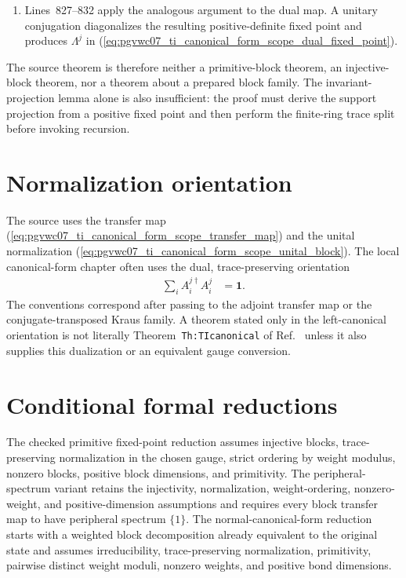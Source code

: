 \documentclass{article}
\begin{document}
\begin{enumerate}
    \item Lines~827--832 apply the analogous argument to the dual map. A
          unitary conjugation diagonalizes the resulting positive-definite
          fixed point and produces $\Lambda^j$ in
          (\ref{eq:pgvwc07_ti_canonical_form_scope_dual_fixed_point}).
\end{enumerate}

The source theorem is therefore neither a primitive-block theorem, an
injective-block theorem, nor a theorem about a prepared block family. The
invariant-projection lemma alone is also insufficient: the proof must derive
the support projection from a positive fixed point and then perform the
finite-ring trace split before invoking recursion.

\section{Normalization orientation}

The source uses the transfer map
(\ref{eq:pgvwc07_ti_canonical_form_scope_transfer_map}) and the unital
normalization
(\ref{eq:pgvwc07_ti_canonical_form_scope_unital_block}). The local
canonical-form chapter often uses the dual, trace-preserving orientation
\begin{align}
    \sum_i A_i^{j\dagger}A_i^j
        &= \mathbf{1}.
    \label{eq:pgvwc07_ti_canonical_form_scope_left_canonical_orientation}
\end{align}
The conventions correspond after passing to the adjoint transfer map or the
conjugate-transposed Kraus family. A theorem stated only in the left-canonical
orientation is not literally Theorem~\texttt{Th:TIcanonical} of
Ref.~\cite{PerezGarcia2007MPSReps} unless it also supplies this dualization or
an equivalent gauge conversion.

\section{Conditional formal reductions}

The checked primitive fixed-point reduction assumes injective blocks,
trace-preserving normalization in the chosen gauge, strict ordering by weight
modulus, nonzero blocks, positive block dimensions, and primitivity. The
peripheral-spectrum variant retains the injectivity, normalization,
weight-ordering, nonzero-weight, and positive-dimension assumptions and
requires every block transfer map to have peripheral spectrum $\{1\}$. The
normal-canonical-form reduction starts with a weighted block decomposition
already equivalent to the original state and assumes irreducibility,
trace-preserving normalization, primitivity, pairwise distinct weight moduli,
nonzero weights, and positive bond dimensions.
\end{document}
